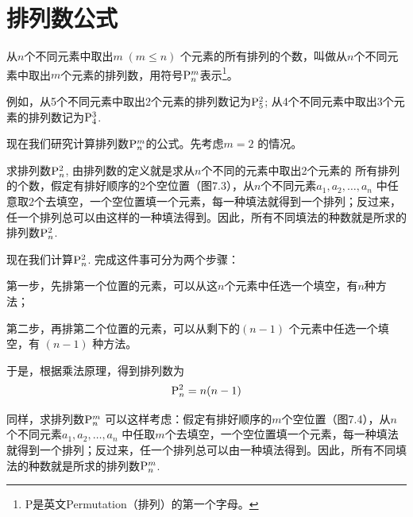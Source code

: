 \section{排列数公式}

从$n$个不同元素中取出$m\; (m\le  n)$ 个元素的所有排列的个数，叫做从$n$个不同元素中取出$m$个元素的排列数，用符号${\rm P}_{n}^{m}$表示\footnote{P是英文Permutation（排列）的第一个字母。}。

例如，从5个不同元素中取出2个元素的排列数记为${\rm P}_{5}^{2}$; 从4个不同元素中取出3个元素的排列数记为${\rm P}_{4}^{3}$.

现在我们研究计算排列数${\rm P}_{n}^{m}$的公式。先考虑$m=2$ 的情况。

求排列数$\perm{n}{2}$, 由排列数的定义就是求从$n$个不同的元素中取出2个元素的
所有排列的个数，假定有排好顺序的2个空位置（图7.3），从$n$个不同元素$a_{1},a_{2},\ldots,a_{n}$ 中任意取2个去填空，一个空位置填一个元素，每一种填法就得到一个排列；反过来，任一个排列总可以由这样的一种填法得到。因此，所有不同填法的种数就是所求的排列数$\perm{n}{2}$.

\begin{figure}[htp]
    \centering
{}
    \caption{}
\end{figure}


现在我们计算$\perm{n}{2}$. 完成这件事可分为两个步骤：

第一步，先排第一个位置的元素，可以从这$n$个元素中任选一个填空，有$n$种方法；

第二步，再排第二个位置的元素，可以从剩下的$(n-1)$ 个元素中任选一个填空，有 $(n-1)$ 种方法。

于是，根据乘法原理，得到排列数为
\[\perm{n}{2}=n(n-1)\]

同样，求排列数$\perm{n}{m}$ 可以这样考虑：假定有排好顺序的$m$个空位置（图7.4），从$n$个不同元素$a_{1},a_{2},\ldots,a_{n}$ 中任取$m$个去填空，一个空位置填一个元素，每一种填法就得到一个排列；反过来，任一个排列总可以由一种填法得到。因此，所有不同填法的种数就是所求的排列数$\perm{n}{m}$.


\begin{figure}[htp]
    \centering
{}
    \caption{}
\end{figure}

